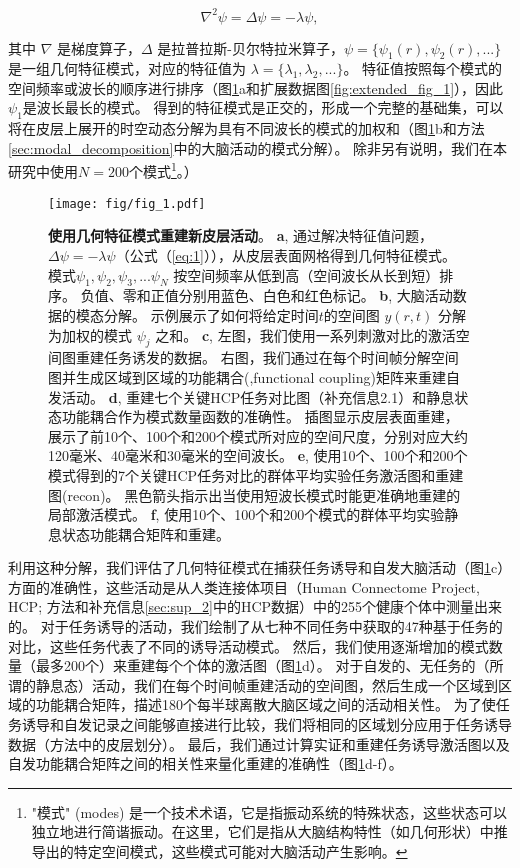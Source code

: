 \documentclass[lang=cn,a4paper,newtx]{elegantpaper}
\begin{document}
\begin{equation} \label{eq:1}
	\nabla^2 \psi = \Delta\psi = -\lambda \psi,
\end{equation}


其中 $ \nabla $ 是梯度算子，$ \Delta $ 是拉普拉斯-贝尔特拉米算子，$ \psi = \{\psi_1(r), \psi_2(r),...\} $ 是一组几何特征模式，对应的特征值为 $ \lambda = \{ \lambda_1, \lambda_2, ... \} $。
特征值按照每个模式的空间频率或波长的顺序进行排序（图\ref{fig:1}a和扩展数据图\ref{fig:extended_fig_1}），因此$ \psi_1 $是波长最长的模式。
得到的特征模式是正交的，形成一个完整的基础集，可以将在皮层上展开的时空动态分解为具有不同波长的模式的加权和（图\ref{fig:1}b和方法\ref{sec:modal_decomposition}中的大脑活动的模式分解）。
除非另有说明，我们在本研究中使用$ N = 200 $个模式\footnote{"模式" (modes) 是一个技术术语，它是指振动系统的特殊状态，这些状态可以独立地进行简谐振动。在这里，它们是指从大脑结构特性（如几何形状）中推导出的特定空间模式，这些模式可能对大脑活动产生影响。}。）


\begin{figure}[!htb]
	\centering
	\texttt{[image: fig/fig\_1.pdf]}
	\caption{\textbf{使用几何特征模式重建新皮层活动}。
	\textbf{a}, 通过解决特征值问题，$ \Delta \psi = -\lambda \psi $（公式（\ref{eq:1}）），从皮层表面网格得到几何特征模式。
	模式$ \psi_1, \psi_2, \psi_3, ... \psi_N $ 按空间频率从低到高（空间波长从长到短）排序。
	负值、零和正值分别用蓝色、白色和红色标记。
	\textbf{b}, 大脑活动数据的模态分解。
	示例展示了如何将给定时间$ t $的空间图 $ y(r,t) $ 分解为加权的模式 $ \psi_j $ 之和。
	\textbf{c}, 左图，我们使用一系列刺激对比的激活空间图重建任务诱发的数据。
	右图，我们通过在每个时间帧分解空间图并生成区域到区域的功能耦合(,functional coupling)矩阵来重建自发活动。
	\textbf{d}, 重建七个关键HCP任务对比图（补充信息2.1）和静息状态功能耦合作为模式数量函数的准确性。
	插图显示皮层表面重建，展示了前10个、100个和200个模式所对应的空间尺度，分别对应大约120毫米、40毫米和30毫米的空间波长。
	 \textbf{e}, 使用10个、100个和200个模式得到的7个关键HCP任务对比的群体平均实验任务激活图和重建图(recon)。
	 黑色箭头指示出当使用短波长模式时能更准确地重建的局部激活模式。 
	 \textbf{f}, 使用10个、100个和200个模式的群体平均实验静息状态功能耦合矩阵和重建。
	} \label{fig:1}
\end{figure}


利用这种分解，我们评估了几何特征模式在捕获任务诱导和自发大脑活动（图\ref{fig:1}c）方面的准确性，这些活动是从人类连接体项目（Human Connectome Project, HCP; 方法和补充信息\ref{sec:sup_2}中的HCP数据）中的255个健康个体中测量出来的。
对于任务诱导的活动，我们绘制了从七种不同任务中获取的47种基于任务的对比，这些任务代表了不同的诱导活动模式。
然后，我们使用逐渐增加的模式数量（最多200个）来重建每个个体的激活图（图\ref{fig:1}d）。
对于自发的、无任务的（所谓的静息态）活动，我们在每个时间帧重建活动的空间图，然后生成一个区域到区域的功能耦合矩阵，描述180个每半球离散大脑区域之间的活动相关性。
为了使任务诱导和自发记录之间能够直接进行比较，我们将相同的区域划分应用于任务诱导数据（方法中的皮层划分）。
最后，我们通过计算实证和重建任务诱导激活图以及自发功能耦合矩阵之间的相关性来量化重建的准确性（图\ref{fig:1}d-f）。
\end{document}
